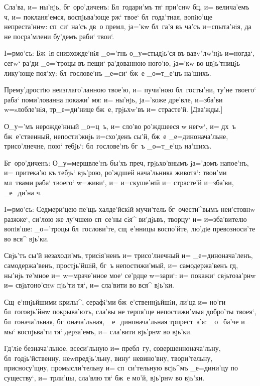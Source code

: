 Сла'ва, и= ны'нjь, бг~оро'диченъ: Бл~годари'мъ тя` 
при'снw бц, и= велича'емъ ч, и= покланя'емся, 
воспjьва'юще рж` твое` бл~года'тная, вопiю'ще 
непреста'ннw: сп~си` на'съ дв~о премл, jа='кw 
бл~га'я въ ча'съ и=спыта'нiя, да не посра'млени бу'демъ 
раби` твои`.


I=рмо'съ: Бж~iя снизхожде'нiя _о='гнь о_у=стыдjь'ся въ 
вавv"лw'нjь и=ногда`, сегw` ра'ди _о='троцы въ пещи` 
ра'дованною ного'ю, jа='кw во цвjь'тницjь лику'юще 
поя'ху: бл~гослове'нъ _е=си` бж~е _о=т_е'цъ на'шихъ.

Прему'дростiю неизглаго'ланною твое'ю, и= пучи'ною 
бл~госты'ни, ту'не твоего` раба` поми'лованна покажи' мя: 
и= ны'нjь, jа='коже дре'вле, и=зба'ви w=sлобле'нiя, 
тр _е=ди'нице бж~е, грjьхw'въ и= страсте'й. 
[Два'жды.]

О_у='мъ нерожде'нный _о=ц~ъ, и= сло'во ро'ждшееся w\т 
негw`, и= дх~ъ бж~е'ственный, непости'жнjь и=схо'денъ 
сы'й, бж~е _е=динонача'льне, трисо'лнечне, пою` тебjь`: 
бл~гослове'нъ бг~ъ _о=т_е'цъ на'шихъ.

Бг~оро'диченъ: О_у=мерщвле'нъ бы'хъ преч, 
грjьхо'внымъ jа='домъ напое'нъ, и= притека'ю къ тебjь` 
вjь'рою, ро'ждшей нача'льника живота`: твои'ми мл~твами 
раба` твоего` w=живи`, и= и=скуше'нiй и= страсте'й 
и=зба'ви, _е=ди'на ч.


I=рмо'съ: Седмери'цею пе'щь халде'йскiй мучи'тель 
бг~очести^вымъ неи'стовнw разжже`, си'лою же лу'чшею 
сп~се'ны сiя^ ви'дjьвъ, творцу` и= и=зба'вителю вопiя'ше: 
_о='троцы бл~гослови'те, сщ~е'нницы воспо'йте, лю'дiе 
превозноси'те во вся^ вjь'ки.

Свjь'тъ сы'й незаходи'мъ, трисiя'ненъ и= трисо'лнечный 
и= _е=динонача'ленъ, самодержа'венъ, простjь'йшiй, бг~ъ 
непостижи'мый, и= самодержа'венъ гд, ны'нjь те'мное и= 
w=мраче'нное мое` се'рдце w=зари`: и= покажи` 
свjьтоза'рнw и= свjьтоно'снw пjь'ти тя`, и= сла'вити во 
вся^ вjь'ки.

Сщ~е'ннjьйшими крилы^, серафi'ми бж~е'ственнjьйшiи, 
ли'ца и= но'ги бл~гоговjь'йнw покрыва'ютъ, сла'вы не 
терпя'ще непостижи'мыя добро'ты твоея`, бл~гонача'льная, 
бг~онача'льная, _е=динонача'льная тр прест~а'я: 
_о=ба'че и= мы` воспjьва'ти тя` дерза'емъ, и= сла'вити 
вjь'рнw во вjь'ки.

Гд'лiе безнача'льное, всеси'льную и= пребл~гу, 
совершеннонача'льну, бл~годjь'йственну, неwпредjь'льну, 
вину` невино'вну, твори'тельну, присносу'щну, 
промысли'тельну и= сп~си'тельную всjь^мъ _е=дини'цу по 
существу`, и= тр ли'цы, сла'влю тя` бж~е мо'й, 
вjь'рнw во вjь'ки.

